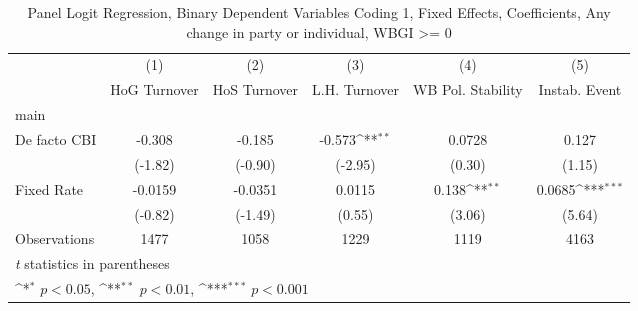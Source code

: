 \begin{table}[htbp]\centering
\def\sym#1{\ifmmode^{#1}\else\(^{#1}\)\fi}
\caption{Panel Logit Regression, Binary Dependent Variables Coding 1, Fixed Effects, Coefficients, Any change in party or individual, WBGI >= 0 \label{logitFEMultIndDF}}
\begin{tabular}{l*{5}{c}}
\toprule
                                        &\multicolumn{1}{c}{(1)}&\multicolumn{1}{c}{(2)}&\multicolumn{1}{c}{(3)}&\multicolumn{1}{c}{(4)}&\multicolumn{1}{c}{(5)}\\
                                        &\multicolumn{1}{c}{HoG Turnover}&\multicolumn{1}{c}{HoS Turnover}&\multicolumn{1}{c}{L.H. Turnover}&\multicolumn{1}{c}{WB Pol. Stability}&\multicolumn{1}{c}{Instab. Event}\\
\midrule
main                                    &                  &                  &                  &                  &                  \\
De facto CBI                            &   -0.308         &   -0.185         &   -0.573\sym{**} &   0.0728         &    0.127         \\
                                        &  (-1.82)         &  (-0.90)         &  (-2.95)         &   (0.30)         &   (1.15)         \\
\addlinespace
Fixed Rate                              &  -0.0159         &  -0.0351         &   0.0115         &    0.138\sym{**} &   0.0685\sym{***}\\
                                        &  (-0.82)         &  (-1.49)         &   (0.55)         &   (3.06)         &   (5.64)         \\
\midrule
Observations                            &     1477         &     1058         &     1229         &     1119         &     4163         \\
\bottomrule
\multicolumn{6}{l}{\footnotesize \textit{t} statistics in parentheses}\\
\multicolumn{6}{l}{\footnotesize \sym{*} \(p<0.05\), \sym{**} \(p<0.01\), \sym{***} \(p<0.001\)}\\
\end{tabular}
\end{table}
